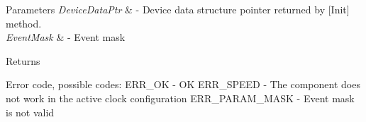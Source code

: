 \begin{DoxyParams}{Parameters}
{\em Device\+Data\+Ptr} & -\/ Device data structure pointer returned by \mbox{[}Init\mbox{]} method. \\
\hline
{\em Event\+Mask} & -\/ Event mask \\
\hline
\end{DoxyParams}
\begin{DoxyReturn}{Returns}

\begin{DoxyItemize}
\item Error code, possible codes\+: E\+R\+R\+\_\+\+OK -\/ OK E\+R\+R\+\_\+\+S\+P\+E\+ED -\/ The component does not work in the active clock configuration E\+R\+R\+\_\+\+P\+A\+R\+A\+M\+\_\+\+M\+A\+SK -\/ Event mask is not valid 
\end{DoxyItemize}
\end{DoxyReturn}
